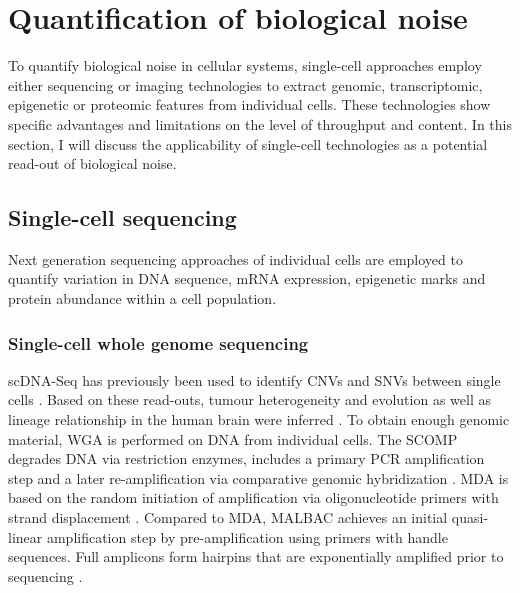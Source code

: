 
\section{Quantification of biological noise} 

To quantify biological noise in cellular systems, single-cell approaches employ either sequencing or imaging technologies to extract genomic, transcriptomic, epigenetic or proteomic features from individual cells. These technologies show specific advantages and limitations on the level of throughput and content. In this section, I will discuss the applicability of single-cell technologies as a potential read-out of biological noise.

\subsection{Single-cell sequencing}

Next generation sequencing approaches of individual cells are employed to quantify variation in DNA sequence, mRNA expression, epigenetic marks and protein abundance within a cell population. 

\subsubsection{Single-cell whole genome sequencing}

\Gls{scDNA-Seq} has previously been used to identify CNVs and SNVs between single cells \citep{Shpunt2012}. Based on these read-outs, tumour heterogeneity and evolution \citep{Navin2011} as well as lineage relationship in the human brain were inferred \citep{Evrony2015}. To obtain enough genomic material, \gls{WGA} is performed on DNA from individual cells. The \gls{SCOMP} degrades DNA via restriction enzymes, includes a primary PCR amplification step and a later re-amplification via comparative genomic hybridization \citep{Klein1999}. \Gls{MDA} is based on the random initiation of amplification via oligonucleotide primers with strand displacement \citep{Dean2002}. Compared to MDA, \gls{MALBAC} achieves an initial quasi-linear amplification step by pre-amplification using primers with handle sequences. Full amplicons form hairpins that are exponentially amplified prior to sequencing \citep{Shpunt2012}. \\

